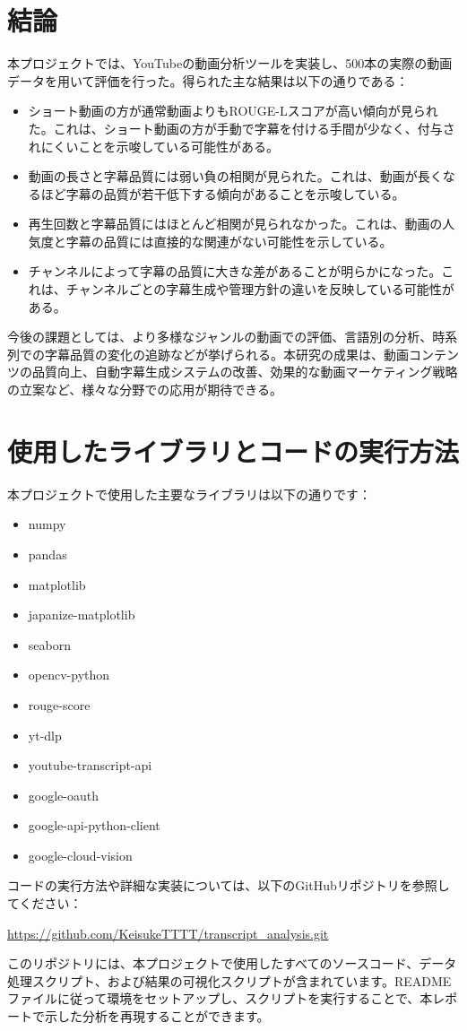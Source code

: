 \documentclass[11pt, a4paper]{ltjsarticle}
\begin{document}
\section{結論}
本プロジェクトでは、YouTubeの動画分析ツールを実装し、500本の実際の動画データを用いて評価を行った。得られた主な結果は以下の通りである：

\begin{itemize}
  \item ショート動画の方が通常動画よりもROUGE-Lスコアが高い傾向が見られた。これは、ショート動画の方が手動で字幕を付ける手間が少なく、付与されにくいことを示唆している可能性がある。
  \item 動画の長さと字幕品質には弱い負の相関が見られた。これは、動画が長くなるほど字幕の品質が若干低下する傾向があることを示唆している。
  \item 再生回数と字幕品質にはほとんど相関が見られなかった。これは、動画の人気度と字幕の品質には直接的な関連がない可能性を示している。
  \item チャンネルによって字幕の品質に大きな差があることが明らかになった。これは、チャンネルごとの字幕生成や管理方針の違いを反映している可能性がある。
\end{itemize}

今後の課題としては、より多様なジャンルの動画での評価、言語別の分析、時系列での字幕品質の変化の追跡などが挙げられる。本研究の成果は、動画コンテンツの品質向上、自動字幕生成システムの改善、効果的な動画マーケティング戦略の立案など、様々な分野での応用が期待できる。

\section{使用したライブラリとコードの実行方法}
本プロジェクトで使用した主要なライブラリは以下の通りです：

\begin{itemize}
  \item numpy
  \item pandas
  \item matplotlib
  \item japanize-matplotlib
  \item seaborn
  \item opencv-python
  \item rouge-score
  \item yt-dlp
  \item youtube-transcript-api
  \item google-oauth
  \item google-api-python-client
  \item google-cloud-vision
\end{itemize}

コードの実行方法や詳細な実装については、以下のGitHubリポジトリを参照してください：

\url{https://github.com/KeisukeTTTT/transcript_analysis.git}

このリポジトリには、本プロジェクトで使用したすべてのソースコード、データ処理スクリプト、および結果の可視化スクリプトが含まれています。READMEファイルに従って環境をセットアップし、スクリプトを実行することで、本レポートで示した分析を再現することができます。
\end{document}
